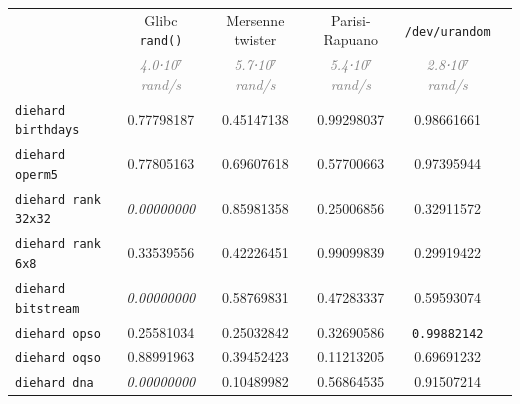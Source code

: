\documentclass[11pt]{report}
\begin{document}
\begin{appendices}
\begin{center}
  \begin{tabular}{lccccc}
    \toprule
                                & Glibc \verb|rand()|                       & Mersenne twister                          & Parisi-Rapuano                            & \verb|/dev/urandom|                       \\
                                & \textcolor{gray}{\slshape 4.0⋅10⁷ rand/s} & \textcolor{gray}{\slshape 5.7⋅10⁷ rand/s} & \textcolor{gray}{\slshape 5.4⋅10⁷ rand/s} & \textcolor{gray}{\slshape 2.8⋅10⁷ rand/s} \\ \cmidrule(l){2-5}
    \verb|diehard birthdays|    & \textcolor{PASSED}{0.77798187}            & \textcolor{PASSED}{0.45147138}            & \textcolor{PASSED}{0.99298037}            & \textcolor{PASSED}{0.98661661}            \\
    \verb|diehard operm5|       & \textcolor{PASSED}{0.77805163}            & \textcolor{PASSED}{0.69607618}            & \textcolor{PASSED}{0.57700663}            & \textcolor{PASSED}{0.97395944}            \\
    \verb|diehard rank 32x32|   & \textit{\textcolor{FAILED}{0.00000000}}   & \textcolor{PASSED}{0.85981358}            & \textcolor{PASSED}{0.25006856}            & \textcolor{PASSED}{0.32911572}            \\
    \verb|diehard rank 6x8|     & \textcolor{PASSED}{0.33539556}            & \textcolor{PASSED}{0.42226451}            & \textcolor{PASSED}{0.99099839}            & \textcolor{PASSED}{0.29919422}            \\
    \verb|diehard bitstream|    & \textit{\textcolor{FAILED}{0.00000000}}   & \textcolor{PASSED}{0.58769831}            & \textcolor{PASSED}{0.47283337}            & \textcolor{PASSED}{0.59593074}            \\
    \verb|diehard opso|         & \textcolor{PASSED}{0.25581034}            & \textcolor{PASSED}{0.25032842}            & \textcolor{PASSED}{0.32690586}            & \texttt{\textcolor{WEAK}{0.99882142}}              \\
    \verb|diehard oqso|         & \textcolor{PASSED}{0.88991963}            & \textcolor{PASSED}{0.39452423}            & \textcolor{PASSED}{0.11213205}            & \textcolor{PASSED}{0.69691232}            \\
    \verb|diehard dna|          & \textit{\textcolor{FAILED}{0.00000000}}   & \textcolor{PASSED}{0.10489982}            & \textcolor{PASSED}{0.56864535}            & \textcolor{PASSED}{0.91507214}            \\

\end{tabular}
\end{center}
\end{appendices}
\end{document}

